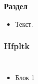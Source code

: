 \begin{frame}[t]
    \frametitle{Раздел}
    \begin{block}{} 
        \vspace{1mm}
        \begin{itemize}\small
            \item Текст.
        \end{itemize}     
    \end{block}  
\end{frame}
\begin{frame}[t]
    \frametitle{Hfpltk}
    \begin{columns}[T]
    
        \begin{itemize}
            \item Блок 1
        \end{itemize}
    
        \begin{block}{\centering}
            \vspace{1mm}
            \centering
        \end{block}
    \end{columns}

\end{frame}
